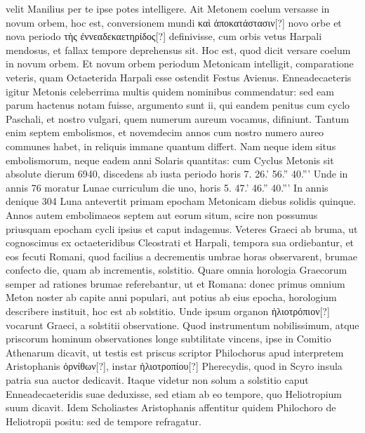 velit Manilius per te ipse potes intelligere.
Ait Metonem coelum
versasse in novum orbem, hoc est, conversionem mundi
 \textgreek{καὶ ἀποκατάστασιν[?]}
novo orbe et nova periodo \textgreek{τὴς ἐννεαδεκαετηρίδος[?]} definivisse, cum
orbis vetus Harpali mendosus, et fallax tempore deprehensus sit.
Hoc est, quod dicit versare coelum in novum orbem.
Et novum
orbem periodum Metonicam intelligit, comparatione veteris, quam
Octaeterida Harpali esse ostendit Festus Avienus.
%
Enneadecaeteris
igitur Metonis celeberrima multis quidem nominibus commendatur:
sed eam parum hactenus notam fuisse, argumento sunt ii,
qui eandem penitus cum cyclo Paschali, et nostro vulgari, quem
numerum aureum vocamus, difiniunt.
Tantum enim septem embolismos,
et novemdecim annos cum nostro numero aureo communes
habet, in reliquis immane quantum differt.
Nam neque
idem situs embolismorum, neque eadem anni Solaris quantitas:
cum Cyclus Metonis sit absolute dierum 6940, discedens
ab iusta periodo horis 7. 26.' 56.'' 40.'''
Unde in annis 76 moratur
Lunae curriculum die uno, horis 5. 47.' 46.'' 40.'''
In annis
denique 304 Luna antevertit primam epocham Metonicam diebus
solidis quinque.
Annos autem embolimaeos septem aut eorum
situm, scire non possumus priusquam epocham cycli ipsius
et caput indagemus.
Veteres Graeci ab bruma, ut cognoscimus
ex octaeteridibus Cleostrati et Harpali, tempora sua ordiebantur,
et eos fecuti Romani, quod facilius a decrementis umbrae
horas observarent, brumae confecto die, quam ab incrementis,
solstitio.
Quare omnia horologia Graecorum semper
ad rationes brumae referebantur, ut et Romana: donec primus
omnium Meton noster ab capite anni populari, aut potius ab eius
epocha, horologium describere instituit, hoc est ab solstitio.
Unde
ipsum organon \textgreek{ἡλιοτρόπιον[?]} vocarunt Graeci,
 a solstitii observatione.
Quod instrumentum nobilissimum, atque priscorum hominum
observationes longe subtilitate vincens, ipse in Comitio
Athenarum dicavit, ut testis est priscus scriptor Philochorus apud
interpretem Aristophanis \textgreek{ὀρνίθων[?]},
 instar \textgreek{ἡλιοτροπίου[?]} Pherecydis, quod
in Scyro insula patria sua auctor dedicavit.
Itaque videtur non solum
a solstitio caput Enneadecaeteridis suae deduxisse, sed etiam
ab eo tempore, quo Heliotropium suum dicavit.
Idem
Scholiastes Aristophanis affentitur quidem Philochoro de Heliotropii
positu: sed de tempore refragatur.
